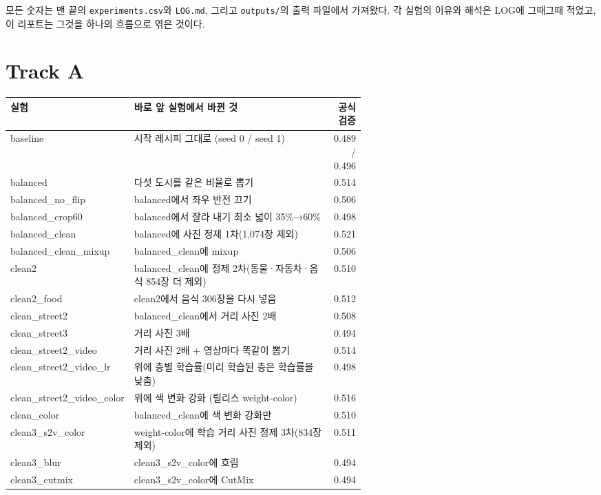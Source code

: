 \documentclass[11pt]{article}
\begin{document}
모든 숫자는 맨 끝의 \texttt{experiments.csv}와 \texttt{LOG.md}, 그리고 \texttt{outputs/}의 출력 파일에서 가져왔다. 각 실험의 이유와 해석은 LOG에 그때그때 적었고, 이 리포트는 그것을 하나의 흐름으로 엮은 것이다.

\section*{Track A}

\begin{center}\footnotesize
\begin{tabular}{lp{0.6\linewidth}r}
\toprule
실험 & 바로 앞 실험에서 바뀐 것 & 공식 검증 \\
\midrule
baseline & 시작 레시피 그대로 (seed 0 / seed 1) & 0.489 / 0.496 \\
balanced & 다섯 도시를 같은 비율로 뽑기 & 0.514 \\
balanced\_no\_flip & balanced에서 좌우 반전 끄기 & 0.506 \\
balanced\_crop60 & balanced에서 잘라 내기 최소 넓이 35\%→60\% & 0.498 \\
balanced\_clean & balanced에 사진 정제 1차(1,074장 제외) & 0.521 \\
balanced\_clean\_mixup & balanced\_clean에 mixup & 0.506 \\
clean2 & balanced\_clean에 정제 2차(동물·자동차·음식 854장 더 제외) & 0.510 \\
clean2\_food & clean2에서 음식 306장을 다시 넣음 & 0.512 \\
clean\_street2 & balanced\_clean에서 거리 사진 2배 & 0.508 \\
clean\_street3 & 거리 사진 3배 & 0.494 \\
clean\_street2\_video & 거리 사진 2배 + 영상마다 똑같이 뽑기 & 0.514 \\
clean\_street2\_video\_lr & 위에 층별 학습률(미리 학습된 층은 학습률을 낮춤) & 0.498 \\
clean\_street2\_video\_color & 위에 색 변화 강화 (릴리스 weight-color) & 0.516 \\
clean\_color & balanced\_clean에 색 변화 강화만 & 0.510 \\
clean3\_s2v\_color & weight-color에 학습 거리 사진 정제 3차(834장 제외) & 0.511 \\
clean3\_blur & clean3\_s2v\_color에 흐림 & 0.494 \\
clean3\_cutmix & clean3\_s2v\_color에 CutMix & 0.494 \\
\bottomrule
\end{tabular}
\end{center}
\end{document}
